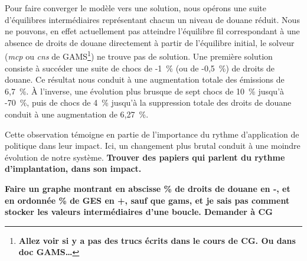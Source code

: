 Pour faire converger le modèle vers une solution, nous opérons une suite d'équilibres intermédiaires représentant chacun un niveau de douane réduit. Nous ne pouvons, en effet actuellement pas atteindre l'équilibre fil correspondant à une absence de droits de douane directement à partir de l'équilibre initial, le solveur (\textit{mcp} ou \textit{cns} de GAMS\footnote{\textbf{Allez voir si y a pas des trucs écrits dans le cours de CG. Ou dans doc GAMS\dots}}) ne trouve pas de solution. Une première solution consiste à succéder une suite de chocs de -1~\% (ou de -0,5~\%) de droits de douane. Ce résultat nous conduit à une augmentation totale des émissions de 6,7~\%. À l'inverse, une évolution plus brusque de sept chocs de 10~\% jusqu'à -70~\%, puis de chocs de 4~\% jusqu'à la suppression totale des droits de douane conduit à une augmentation de 6,27~\%.

Cette observation témoigne en partie de l'importance du rythme d'application de politique dans leur impact. Ici, un changement plus brutal conduit à une moindre évolution de notre système. \textbf{Trouver des papiers qui parlent du rythme d'implantation, dans son impact.}

\textbf{Faire un graphe montrant en abscisse \% de droits de douane en -, et en ordonnée \% de GES en +, sauf que gams, et je sais pas comment stocker les valeurs intermédiaires d'une boucle. Demander à CG}
